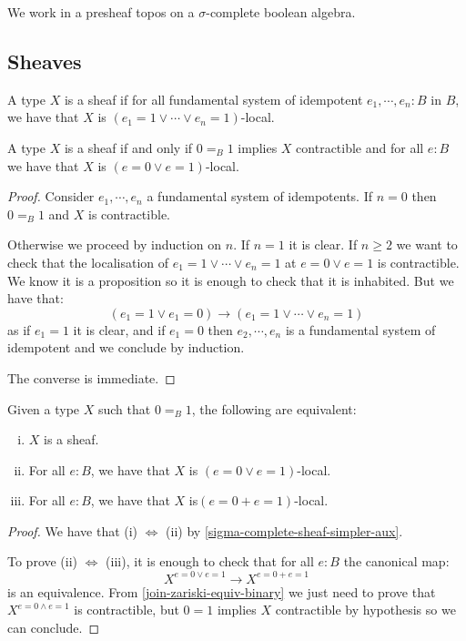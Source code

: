 We work in a presheaf topos on a $\sigma$-complete boolean algebra.


\subsection{Sheaves}

\begin{definition}
A type $X$ is a sheaf if for all fundamental system of idempotent $e_1,\cdots,e_n:B$ in $B$, we have that $X$ is $(e_1=1\lor\cdots\lor e_n=1)$-local.
\end{definition}

\begin{lemma}\label{sigma-complete-sheaf-simpler-aux}
A type $X$ is a sheaf if and only if $0=_B1$ implies $X$ contractible and for all $e:B$ we have that $X$ is $(e=0\lor e=1)$-local.
\end{lemma}

\begin{proof}
Consider $e_1,\cdots,e_n$ a fundamental system of idempotents. If $n=0$ then $0=_B1$ and $X$ is contractible. 

Otherwise we proceed by induction on $n$. If $n=1$ it is clear. If $n\geq 2$ we want to check that the localisation of $e_1=1\lor\cdots\lor e_n=1$ at $e=0\lor e=1$ is contractible. We know it is a proposition so it is enough to check that it is inhabited. But we have that:
\[(e_1=1\lor e_1=0) \to (e_1=1\lor\cdots\lor e_n=1)\]
as if $e_1=1$ it is clear, and if $e_1=0$ then $e_2,\cdots,e_n$ is a fundamental system of idempotent and we conclude by induction.

The converse is immediate.
\end{proof}

\begin{lemma}\label{sigma-complete-sheaf-simpler}
Given a type $X$ such that $0=_B1$, the following are equivalent:
\begin{enumerate}[(i)]
\item $X$ is a sheaf.
\item For all $e:B$, we have that $X$ is $(e=0\lor e=1)$-local.
\item For all $e:B$, we have that $X$ is$(e=0 + e=1)$-local.
\end{enumerate}
\end{lemma}

\begin{proof}
We have that (i) $\Leftrightarrow$ (ii) by \cref{sigma-complete-sheaf-simpler-aux}.

To prove (ii) $\Leftrightarrow$ (iii), it is enough to check that for all $e:B$ the canonical map:
\[X^{e=0\lor e=1} \to X^{e=0+ e=1}\]
is an equivalence. From \cref{join-zariski-equiv-binary} we just need to prove that $X^{e=0\land e=1}$ is contractible, but $0=1$ implies $X$ contractible by hypothesis so we can conclude.
\end{proof}

